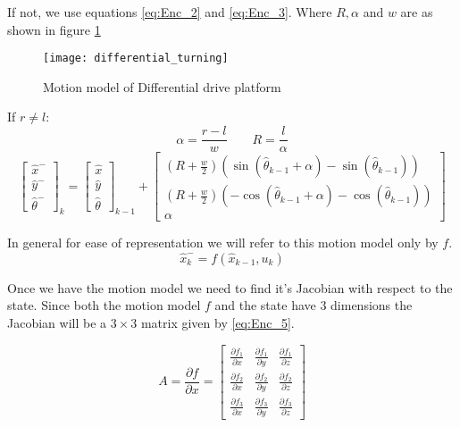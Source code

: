 If not, we use equations \ref{eq:Enc_2} and \ref{eq:Enc_3}. Where $ R,\alpha $ and $ w $ are as shown in figure \ref{fig:Enc_1}
			
\begin{figure}
\centering
\texttt{[image: differential\_turning]}
\caption{Motion model of Differential drive platform}
\label{fig:Enc_1}
\end{figure}
If $ r \neq l $:
\begin{equation}
\label{eq:Enc_2}
	\alpha= \frac{r-l}{w}
\qquad
	R=\frac{l}{\alpha}
\end{equation}
\begin{equation}
\label{eq:Enc_3}
	\begin{bmatrix}
		\hat{x}^-\\\hat{y}^-\\\hat{\theta}^-
	\end{bmatrix}_k
	=
	\begin{bmatrix}
		\hat{x}\\\hat{y}\\\hat{\theta}
	\end{bmatrix}_{k-1}
	+
	\begin{bmatrix}
		\left(R+\frac{w}{2}\right)(\sin(\hat{\theta}_{k-1}+\alpha)-\sin(\hat{\theta}_{k-1}))\\
		\left(R+\frac{w}{2}\right)(-\cos(\hat{\theta}_{k-1}+\alpha)-\cos(\hat{\theta}_{k-1}))\\
		\alpha
	\end{bmatrix}
\end{equation}

In general for ease of representation we will refer to this motion model only by $ f $. 
\begin{equation}
\label{eq:Enc_4}
\hat{x}^-_k = f(\hat{x}_{k-1},u_k)
\end{equation}

Once we have the motion model we need to find it's Jacobian with respect to the state. Since both the motion model $ f $ and the state have 3 dimensions the Jacobian will be a $ 3\times 3 $ matrix given by \ref{eq:Enc_5}. 

\begin{equation}
\label{eq:Enc_5}
A = \frac{\partial f}{\partial x} = 
\begin{bmatrix}
\frac{\partial f_1}{\partial x} & \frac{\partial f_1}{\partial y} & \frac{\partial f_1}{\partial z} \\
\frac{\partial f_2}{\partial x} & \frac{\partial f_2}{\partial y} & \frac{\partial f_2}{\partial z} \\
\frac{\partial f_3}{\partial x} & \frac{\partial f_3}{\partial y} & \frac{\partial f_3}{\partial z}
\end{bmatrix}
\end{equation}


